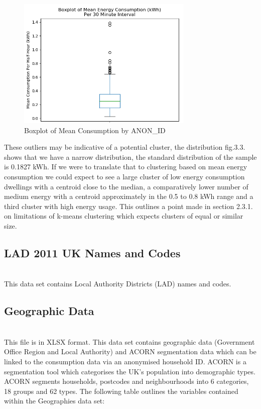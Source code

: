         \begin{figure}[H]
        \centering     
        \includegraphics[width=0.75\textwidth]{Figures/EDA_images/mean_consumption_boxplot.png}
        \caption{Boxplot of Mean Consumption by ANON\_ID}
        \label{fig:Daily Consumption}
        \end{figure}
        
        These outliers may be indicative of a potential cluster, the distribution fig.3.3. shows that we have a narrow distribution, the standard distribution of the sample is 0.1827 kWh. If we were to translate that to clustering based on mean energy consumption we could expect to see a large cluster of low energy consumption dwellings with a centroid close to the median, a comparatively lower number of medium energy with a centroid approximately in the 0.5 to 0.8 kWh range and a third cluster with high energy usage. This outlines a point made in section 2.3.1. on limitations of k-means clustering which expects clusters of equal or similar size.
        
        \subsection{LAD 2011 UK Names and Codes} \\
        This data set contains Local Authority Districts (LAD) names and codes.
        
        \subsection{Geographic Data}
        \\
        This file is in XLSX format. This data set contains geographic data (Government Office Region and Local Authority) and ACORN segmentation data which can be linked to the consumption data via an anonymised household ID. ACORN is a segmentation tool which categorises the UK's population into demographic types. ACORN segments households, postcodes and neighbourhoods into 6 categories, 18 groups and 62 types. The following table outlines the variables contained within the Geographies data set:
        
